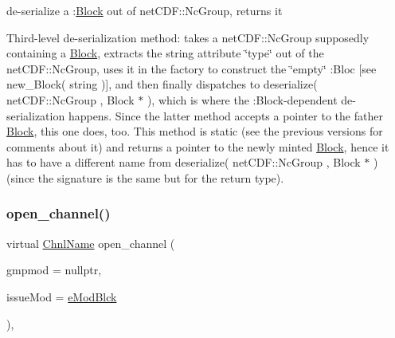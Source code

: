 de-\/serialize a \+:\mbox{\hyperlink{class_s_m_spp__di__unipi__it_1_1_block}{Block}} out of net\+C\+D\+F\+::\+Nc\+Group, returns it 

Third-\/level de-\/serialization method\+: takes a net\+C\+D\+F\+::\+Nc\+Group supposedly containing a \mbox{\hyperlink{class_s_m_spp__di__unipi__it_1_1_block}{Block}}, extracts the string attribute \char`\"{}type\char`\"{} out of the net\+C\+D\+F\+::\+Nc\+Group, uses it in the factory to construct the \char`\"{}empty\char`\"{} \+:Bloc \mbox{[}see new\+\_\+\+Block( string )\mbox{]}, and then finally dispatches to deserialize( net\+C\+D\+F\+::\+Nc\+Group , Block $\ast$ ), which is where the \+:Block-\/dependent de-\/serialization happens. Since the latter method accepts a pointer to the father \mbox{\hyperlink{class_s_m_spp__di__unipi__it_1_1_block}{Block}}, this one does, too. This method is static (see the previous versions for comments about it) and returns a pointer to the newly minted \mbox{\hyperlink{class_s_m_spp__di__unipi__it_1_1_block}{Block}}, hence it has to have a different name from deserialize( net\+C\+D\+F\+::\+Nc\+Group , Block $\ast$ ) (since the signature is the same but for the return type). \mbox{\label{class_s_m_spp__di__unipi__it_1_1_block_a6459343d63aec3d39ece1e20467db47b}} 
\subsubsection{\texorpdfstring{open\+\_\+channel()}{open\_channel()}}
{\footnotesize\ttfamily virtual \mbox{\hyperlink{class_s_m_spp__di__unipi__it_1_1_observer_a54ce8db639626e45b1f20c289baa989b}{Chnl\+Name}} open\+\_\+channel (\begin{DoxyParamCaption}\item[{\mbox{\hyperlink{class_s_m_spp__di__unipi__it_1_1_group_modification}{Group\+Modification}} $\ast$}]{gmpmod = {\ttfamily nullptr},  }\item[{\mbox{\hyperlink{group___modification___t_y_p_e_s_ga544246d8c462e9a2d817c2c30797968f}{c\+\_\+\+Mod\+Param}}}]{issue\+Mod = {\ttfamily \mbox{\hyperlink{group___modification___t_y_p_e_s_gga48fddcdd03a03f49b7e389ca1ed938d4a21b14b26b1c0093a0905f6fc010bad29}{e\+Mod\+Blck}}} }\end{DoxyParamCaption})\hspace{0.3cm}{\ttfamily [override]}, {\ttfamily [virtual]}}



